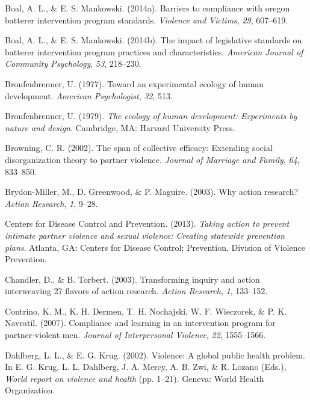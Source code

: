 \documentclass[11pt,]{tufte-book}
\begin{document}
\hypertarget{ref-boal2014barriers}{}
Boal, A. L., \& E. S. Mankowski. (2014a). Barriers to compliance with
oregon batterer intervention program standards. \emph{Violence and
Victims}, \emph{29}, 607--619.

\hypertarget{ref-boal2014impact}{}
Boal, A. L., \& E. S. Mankowski. (2014b). The impact of legislative
standards on batterer intervention program practices and
characteristics. \emph{American Journal of Community Psychology},
\emph{53}, 218--230.

\hypertarget{ref-bronfenbrenner1977toward}{}
Bronfenbrenner, U. (1977). Toward an experimental ecology of human
development. \emph{American Psychologist}, \emph{32}, 513.

\hypertarget{ref-bronfenbrenner1979ecology}{}
Bronfenbrenner, U. (1979). \emph{The ecology of human development:
Experiments by nature and design}. Cambridge, MA: Harvard University
Press.

\hypertarget{ref-browning2002span}{}
Browning, C. R. (2002). The span of collective efficacy: Extending
social disorganization theory to partner violence. \emph{Journal of
Marriage and Family}, \emph{64}, 833--850.

\hypertarget{ref-brydon-miller2003why}{}
Brydon-Miller, M., D. Greenwood, \& P. Maguire. (2003). Why action
research? \emph{Action Research}, \emph{1}, 9--28.

\hypertarget{ref-centers2013taking}{}
Centers for Disease Control and Prevention. (2013). \emph{Taking action
to prevent intimate partner violence and sexual violence: Creating
statewide prevention plans}. Atlanta, GA: Centers for Disease Control;
Prevention, Division of Violence Prevention.

\hypertarget{ref-chandler2003transforming}{}
Chandler, D., \& B. Torbert. (2003). Transforming inquiry and action
interweaving 27 flavors of action research. \emph{Action Research},
\emph{1}, 133--152.

\hypertarget{ref-contrino2007compliance}{}
Contrino, K. M., K. H. Dermen, T. H. Nochajski, W. F. Wieczorek, \& P.
K. Navratil. (2007). Compliance and learning in an intervention program
for partner-violent men. \emph{Journal of Interpersonal Violence},
\emph{22}, 1555--1566.

\hypertarget{ref-dahlberg2002violence}{}
Dahlberg, L. L., \& E. G. Krug. (2002). Violence: A global public health
problem. In E. G. Krug, L. L. Dahlberg, J. A. Mercy, A. B. Zwi, \& R.
Lozano (Eds.), \emph{World report on violence and health} (pp. 1--21).
Geneva: World Health Organization.
\end{document}
